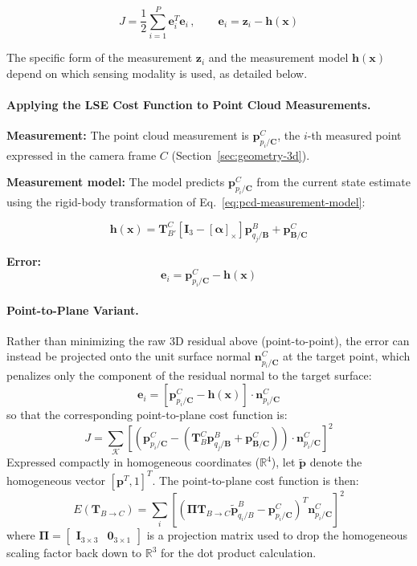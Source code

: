\documentclass{article}
\newcommand{\vect}[1]{\mathbf{#1}}
\newcommand{\mat}[1]{\mathbf{#1}}
\newcommand{\TCB}{\mat{T}^C_{B}}
\newcommand{\pBjB}{\vect{p}^{\mathit{B}}_{q_{j}/\mathbf{B}}}
\newcommand{\pCiC}{\vect{p}^{\mathit{C}}_{p_{i}/\mathbf{C}}}
\newcommand{\pBCC}{\vect{p}^{\mathit{C}}_{\mathbf{B}/\mathbf{C}}}
\newcommand{\TBCtoC}{\mat{T}_{\mathit{B} \rightarrow \mathit{C}}} %
\newcommand{\nCiC}{\vect{n}^{\mathit{C}}_{p_{i}/\mathbf{C}}} %
\newcommand{\Kmat}{\mat{K}} %
\newcommand{\corrSet}{\mathcal{K}} %
\newcommand{\rotErr}{\vect{\alpha}} %
\newcommand{\skewop}[1]{\left[#1\right]_{\times}} %
\newcommand{\stateVec}{\vect{x}}
\newcommand{\err}{\vect{e}}
\begin{document}
\begin{equation}
    J = \frac{1}{2}\sum_{i=1}^{P} \err_i^T \err_i \, , \qquad
    \err_i = \vect{z}_i - \vect{h}(\stateVec)
\end{equation}

The specific form of the measurement $\vect{z}_i$ and the measurement model $\vect{h}(\stateVec)$ depend on which sensing modality is used, as detailed below.

\paragraph{Applying the LSE Cost Function to Point Cloud Measurements.}

\textbf{Measurement:} The point cloud measurement is $\pCiC$, the $i$-th measured point expressed in the camera frame $C$ (Section~\ref{sec:geometry-3d}).

\textbf{Measurement model:} The model predicts $\pCiC$ from the current state estimate using the rigid-body transformation of Eq.~\eqref{eq:pcd-measurement-model}:

\begin{equation}
    \vect{h}(\stateVec) = \mat{T}^{C}_{B'} \left[ \mat{I}_3 - \skewop{\rotErr} \right] \pBjB + \pBCC
\end{equation}

\textbf{Error:}
\begin{equation}
    \err_i = \pCiC - \vect{h}(\stateVec)
\end{equation}

\paragraph{Point-to-Plane Variant.} Rather than minimizing the raw 3D residual above (point-to-point), the error can instead be projected onto the unit surface normal $\nCiC$ at the target point, which penalizes only the component of the residual normal to the target surface:
\begin{equation}
    \err_i = \left[ \pCiC - \vect{h}(\stateVec) \right] \cdot \nCiC
\end{equation}
so that the corresponding point-to-plane cost function is:
\begin{equation}
    J = \sum_{\corrSet} \left[ \left( \pCiC - (\TCB \pBjB + \pBCC) \right) \cdot \nCiC \right]^2
\end{equation}
Expressed compactly in homogeneous coordinates ($\mathbb{R}^4$), let $\tilde{\vect{p}}$ denote the homogeneous vector $[ \vect{p}^T, 1 ]^T$. The point-to-plane cost function is then:
\begin{equation}
    E(\TBCtoC) = \sum_{i} \left[ \left( \mathbf{\Pi} \TBCtoC \tilde{\vect{p}}^B_{q_{i}/B} - \pCiC \right)^T \nCiC \right]^2
\end{equation}
where $\mathbf{\Pi} = \begin{bmatrix} \mat{I}_{3\times3} & \vect{0}_{3\times1} \end{bmatrix}$ is a projection matrix used to drop the homogeneous scaling factor back down to $\mathbb{R}^3$ for the dot product calculation.
\end{document}
